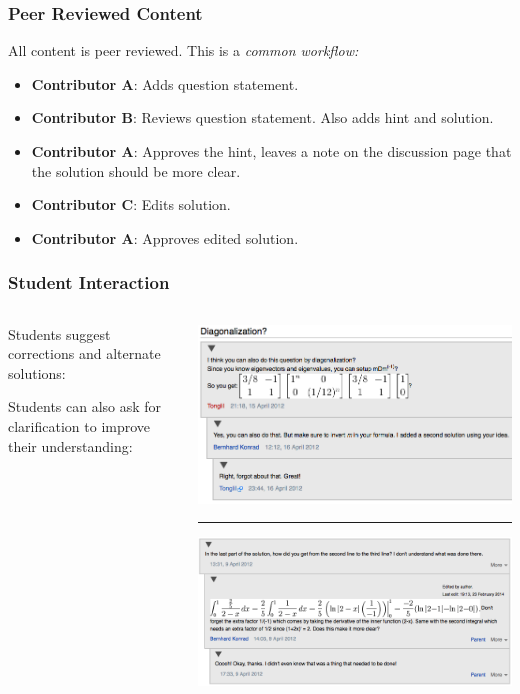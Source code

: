 \documentclass{beamer}
\begin{document}
\frame
{\frametitle{\bf{Peer Reviewed Content}}

All content is peer reviewed. This is a \emph{common workflow:}

\medskip

\begin{itemize}
\item \textbf{Contributor A}: Adds question statement.
\item \textbf{Contributor B}: Reviews question statement. Also adds hint and solution.
\item \textbf{Contributor A}: Approves the hint, leaves a note on the discussion page that the solution should be more clear.
\item \textbf{Contributor C}: Edits solution.
\item \textbf{Contributor A}: Approves edited solution.
\end{itemize}
}



\frame
{\frametitle{{\bf Student Interaction}}

\begin{columns}
\begin{column}{0.3\textwidth}
Students suggest corrections and alternate solutions:
\newline
\vspace{4em}

Students can also ask for clarification to improve their understanding:
\end{column}
\begin{column}{0.7\textwidth}
\includegraphics[width=\textwidth]{diagonalization.png}
\hrule
\smallskip
\includegraphics[width=\textwidth]{CommentQuestion3.png}
\end{column}
\end{columns}

}
\end{document}
